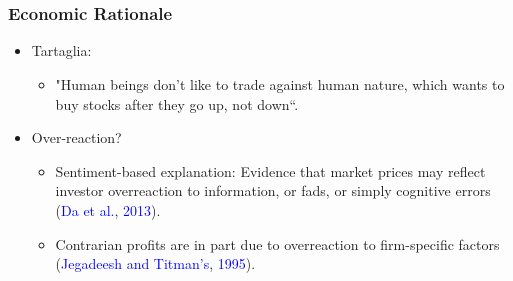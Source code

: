 \documentclass[pdf,10pt,xcolor=dvipsnames,hide notes]{beamer}
\begin{document}
\section{}

\begin{frame}[label=frame1]
\frametitle{Economic Rationale}


\begin{itemize}
	\justifying
	
	
	\item Tartaglia:
	
	\begin{itemize}
		\setlength\itemsep{1em}
		\item "Human beings don't like to trade against human nature, which wants to buy stocks after they go up, not down``.
	\end{itemize}

	\vspace{0.3cm}
	
	\item Over-reaction? 
	\begin{itemize} 
		\item Sentiment-based explanation: Evidence that market prices may reflect investor overreaction to information, or fads, or simply cognitive errors (\textcolor{blue}{Da et al.}, \textcolor{blue}{2013}).
		\item Contrarian profits are in part due to overreaction to firm-specific factors (\textcolor{blue}{Jegadeesh and Titman's}, \textcolor{blue}{1995}).
	\end{itemize}




\end{itemize}
\end{frame}
\end{document}
